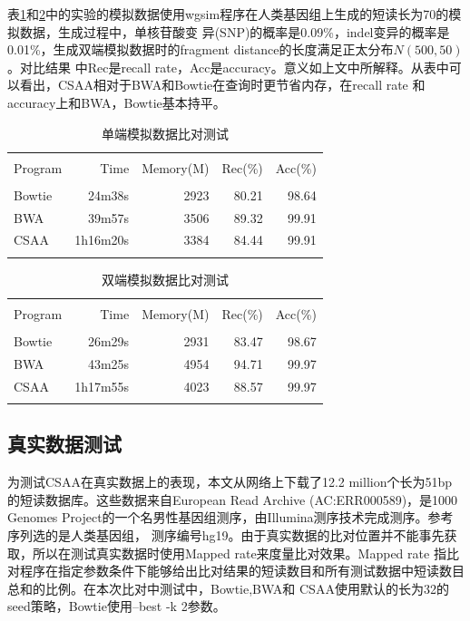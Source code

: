 \documentclass[UTF8,adobefonts]{ctexart}
\begin{document}
表\ref{tab:singleend}和\ref{tab:pairend}中的实验的模拟数据使用wgsim程序在人类基因组上生成的短读长为70的模拟数据，生成过程中，单核苷酸变
异(SNP)的概率是0.09\%，indel变异的概率是0.01\%，生成双端模拟数据时的fragment distance的长度满足正太分布$N(500,50)$。对比结果
中Rec是recall rate，Acc是accuracy。意义如上文中所解释。从表中可以看出，CSAA相对于BWA和Bowtie在查询时更节省内存，在recall rate
和accuracy上和BWA，Bowtie基本持平。%

\begin{table}[htbp]
    \caption{单端模拟数据比对测试}
    \label{tab:singleend}
    \centering
    \begin{tabular}{lrrrr}
       \hline \\
       Program&Time&Memory(M)&Rec(\%)&Acc(\%)\\
       \hline \\
       Bowtie&24m38s&2923&80.21&98.64\\
       BWA&39m57s&3506&89.32&99.91\\
       CSAA&1h16m20s&3384&84.44&99.91\\
       \hline\\
    \end{tabular}
\end{table}


\begin{table}[htbp]
    \caption{双端模拟数据比对测试}
    \label{tab:pairend}
    \centering
    \begin{tabular}{lrrrr}
       \hline \\
       Program&Time&Memory(M)&Rec(\%)&Acc(\%)\\
       \hline \\
       Bowtie&26m29s&2931&83.47&98.67\\
       BWA&43m25s&4954&94.71&99.97\\
       CSAA&1h17m55s&4023&88.57&99.97\\
       \hline\\
    \end{tabular}
\end{table}

\subsection{真实数据测试}
为测试CSAA在真实数据上的表现，本文从网络上下载了12.2 million个长为51bp的短读数据库。这些数据来自European Read Archive
(AC:ERR000589)，是1000 Genomes Project的一个名男性基因组测序，由Illumina测序技术完成测序。参考序列选的是人类基因组，
测序编号hg19。由于真实数据的比对位置并不能事先获取，所以在测试真实数据时使用Mapped rate来度量比对效果。Mapped rate
指比对程序在指定参数条件下能够给出比对结果的短读数目和所有测试数据中短读数目总和的比例。在本次比对中测试中，Bowtie,BWA和
CSAA使用默认的长为32的seed策略，Bowtie使用--best -k 2参数。
\end{document}
